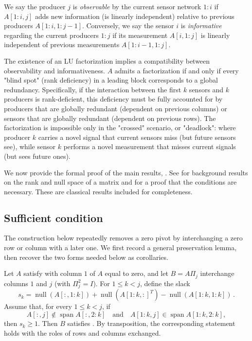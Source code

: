 \documentclass[10pt,twoside]{siamart1116}
\DeclareMathOperator{\nl}{null}
\numberwithin{theorem}{section}
\begin{document}
We say the producer $j$ is \emph{observable} by the current sensor network $1:i$ if $A[1:i,j]$ adds new information (is linearly independent) relative to previous producers $A[1:i,1:j-1]$. Conversely, we say the sensor $i$ is \emph{informative} regarding the current producers $1:j$ if its measurement $A[i,1:j]$ is linearly independent of previous measurements $A[1:i-1,1:j]$.

The existence of an LU factorization implies a compatibility between observability and informativeness. $A$ admits a factorization if and only if every "blind spot" (rank deficiency) in a leading block corresponds to a global redundancy. Specifically, if the interaction between the first $k$ sensors and $k$ producers is rank-deficient, this deficiency must be fully accounted for by producers that are globally redundant (dependent on previous columns) or sensors that are globally redundant (dependent on previous rows). The factorization is impossible only in the "crossed" scenario, or "deadlock": where producer $k$ carries a novel signal that current sensors miss (but future sensors see), while sensor $k$ performs a novel measurement that misses current signals (but sees future ones).

We now provide the formal proof of the main results, . See  for background results on the rank and null space of a matrix and  for a proof that the conditions are necessary. These are classical results included for completeness.

\subsection{Sufficient condition}

The construction below repeatedly removes a zero pivot by interchanging a zero row or column with a later one. We first record a general preservation lemma, then recover the two forms needed below as corollaries.

\begin{lemma}\label{lem:zero-column-swap}
  Let $A$ satisfy  with column $1$ of $A$ equal to zero, and let $B = A\Pi_j$ interchange columns $1$ and $j$ (with $\Pi_j^2 = I$). For $1 \le k < j$, define the slack
  \[
    s_k =
    \nl(A[:,1:k]) + \nl({A[1:k,:]}^T) - \nl(A[1:k,1:k]) \,.
  \]
  Assume that, for every $1 \le k < j$, if
  \[
    A[:,j] \notin \operatorname{span} A[:,2:k]
    \quad\text{and}\quad
    A[1:k,j] \in \operatorname{span} A[1:k,2:k],
  \]
  then $s_k \ge 1$. Then $B$ satisfies . By transposition, the corresponding statement holds with the roles of rows and columns exchanged.
\end{lemma}
\end{document}
